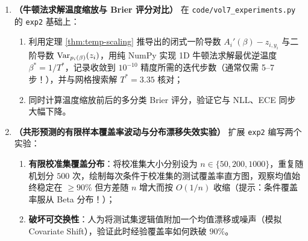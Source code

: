 \begin{enumerate}[label=\textbf{7.2.\arabic*}, start=5]
  \item \textbf{（牛顿法求解温度缩放与 Brier 评分对比）} 在 \texttt{code/vol7\_experiments.py} 的 \texttt{exp2} 基础上：
  \begin{enumerate}
    \item 利用定理 \ref{thm:temp-scaling} 推导出的闭式一阶导数 $A_i'(\beta) - z_{i,y_i}$ 与二阶导数 $\operatorname{Var}_{p_i(\beta)}(z_i)$，用纯 NumPy 实现 1D 牛顿法求解最优逆温度 $\beta^* = 1/T^*$，记录收敛到 $10^{-10}$ 精度所需的迭代步数（通常仅需 5--7 步！），并与网格搜索解 $T^*=3.35$ 核对；
    \item 同时计算温度缩放前后的多分类 Brier 评分，验证它与 NLL、ECE 同步大幅下降。
  \end{enumerate}

  \item \textbf{（共形预测的有限样本覆盖率波动与分布漂移失效实验）} 扩展 \texttt{exp2} 编写两个实验：
  \begin{enumerate}
    \item \textbf{有限校准集覆盖分布}：将校准集大小分别设为 $n \in \{50, 200, 1000\}$，重复随机划分 $500$ 次，绘制每次条件于校准集的测试覆盖率直方图，观察均值始终稳定在 $\ge 90\%$ 但方差随 $n$ 增大而按 $O(1/n)$ 收缩（提示：条件覆盖率服从 Beta 分布！）；
    \item \textbf{破坏可交换性}：人为将测试集逻辑值附加一个均值漂移或噪声（模拟 Covariate Shift），验证此时经验覆盖率如何跌破 $90\%$。
  \end{enumerate}
\end{enumerate}


